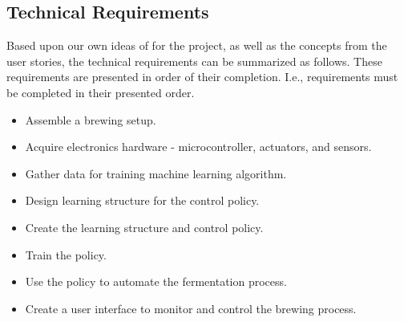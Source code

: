 \documentclass[draftclsnofoot,onecolumn,letterpaper,10pt]{IEEEtran}
\begin{document}
\subsection{Technical Requirements}
Based upon our own ideas of for the project, as well as the concepts from the user stories, the technical requirements can be summarized as follows.
These requirements are presented in order of their completion.
I.e., requirements must be completed in their presented order.
\begin{itemize}
	\item Assemble a brewing setup.
	\item Acquire electronics hardware - microcontroller, actuators, and sensors.
	\item Gather data for training machine learning algorithm.
	\item Design learning structure for the control policy.
	\item Create the learning structure and control policy.
	\item Train the policy.
	\item Use the policy to automate the fermentation process.
	\item Create a user interface to monitor and control the brewing process.
\end{itemize}
\end{document}
